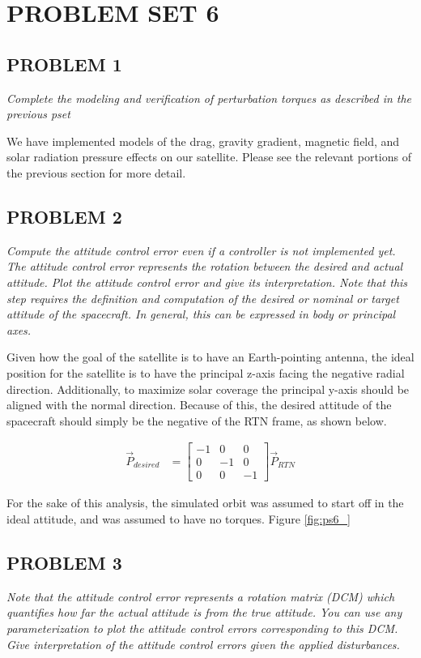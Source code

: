 \section{\Large PROBLEM SET 6}
\subsection{PROBLEM 1}
\textit{Complete the modeling and verification of perturbation torques as described in the previous pset}

We have implemented models of the drag, gravity gradient, magnetic field, and solar radiation pressure effects on our satellite. Please see the relevant portions of the previous section for more detail.


\subsection{PROBLEM 2}
\textit{Compute the attitude control error even if a controller is not implemented yet. The attitude control error represents the rotation between the desired and actual attitude. Plot the attitude control error and give its interpretation. Note that this step requires the definition and computation of the desired or nominal or target attitude of the spacecraft. In general, this can be expressed in body or principal axes.}

Given how the goal of the satellite is to have an Earth-pointing antenna, the ideal position for the satellite is to have the principal z-axis facing the negative radial direction. Additionally, to maximize solar coverage the principal y-axis should be aligned with the normal direction. Because of this, the desired attitude of the spacecraft should simply be the negative of the RTN frame, as shown below.

\begin{align*}
    \Vec{P}_{desired} &= 
    \begin{bmatrix}
    -1 & 0 & 0 \\
    0 & -1 & 0 \\
    0 & 0 & -1
    \end{bmatrix}
    \Vec{P}_{RTN}
\end{align*}

For the sake of this analysis, the simulated orbit was assumed to start off in the ideal attitude, and was assumed to have no torques. Figure \ref{fig:ps6_}

\subsection{PROBLEM 3}
\textit{Note that the attitude control error represents a rotation matrix (DCM) which quantifies how far the actual attitude is from the true attitude. You can use any parameterization to plot the attitude control errors corresponding to this DCM. Give interpretation of the attitude control errors given the applied disturbances.}

